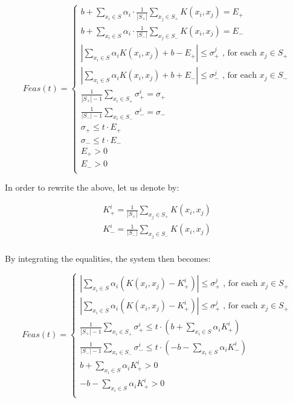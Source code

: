 \documentclass[a4paper,twoside,10pt]{report}
\begin{document}
	\[
		Feas(t) = \left\{
		\begin{array}{l}			
				b + \sum_{x_i\in S} {\alpha_i \cdot \frac{1}{|S_+|}\sum_{x_j\in S_+} {K(x_i, x_j)}} = E_+\\
				b + \sum_{x_i\in S} {\alpha_i \cdot \frac{1}{|S_-|}\sum_{x_j\in S_-} {K(x_i, x_j)}} = E_-\\
				
				|\sum_{x_i\in S} {\alpha_i K(x_i, x_j)} + b - E_+| \leq \sigma^j_+ \mbox{ , for each } x_j \in S_+\\
				|\sum_{x_i\in S} {\alpha_i K(x_i, x_j)} + b + E_-| \leq \sigma^j_- \mbox{ , for each } x_j \in S_-\\
					
				\frac{1}{|S_+| - 1} \sum_{x_i\in S_+} {\sigma_+^i} = {\sigma_+} \\
				\frac{1}{|S_-| - 1} \sum_{x_i\in S_-} {\sigma_-^i} = {\sigma_-} \\
				
				\sigma_+ \leq t \cdot E_+\\
				\sigma_- \leq t \cdot E_-\\
				E_+ > 0\\
				E_- > 0\\
		\end{array}
		\right. \label{feas_1}
	\]	
	
	In order to rewrite the above, let us denote by:
	
	\[
		\begin{array}{l}
			K^i_+ = \frac{1}{|S_+|}\sum_{x_j \in S_+} {K(x_i, x_j)} \\
			K^i_- = \frac{1}{|S_-|}\sum_{x_j \in S_-} {K(x_i, x_j)} \\
		\end{array}
	\]
	
	By integrating the equalities, the system then becomes:
	
	\[
		Feas(t) = \left\{
		\begin{array}{l}			
				|\sum_{x_i\in S} {\alpha_i (K(x_i, x_j) - K^i_+)}| \leq \sigma^j_+ \mbox{ , for each } x_j \in S_+\\
				|\sum_{x_i\in S} {\alpha_i (K(x_i, x_j) - K^i_+)}| \leq \sigma^j_+ \mbox{ , for each } x_j \in S_+\\								
				
				\frac{1}{|S_+| - 1} \sum_{x_i\in S_+} {\sigma_+^i} \leq t \cdot (b + \sum_{x_i\in S}{\alpha_i K^i_+})\\
				\frac{1}{|S_-| - 1} \sum_{x_i\in S_-} {\sigma_-^i} \leq t \cdot (-b - \sum_{x_i\in S}{\alpha_i K^i_-})\\
				b + \sum_{x_i\in S}{\alpha_i K^i_+} > 0\\
				- b - \sum_{x_i\in S}{\alpha_i K^i_+} > 0\\
		\end{array}
		\right. \label{feas_2}
	\]	
	
\end{document}
